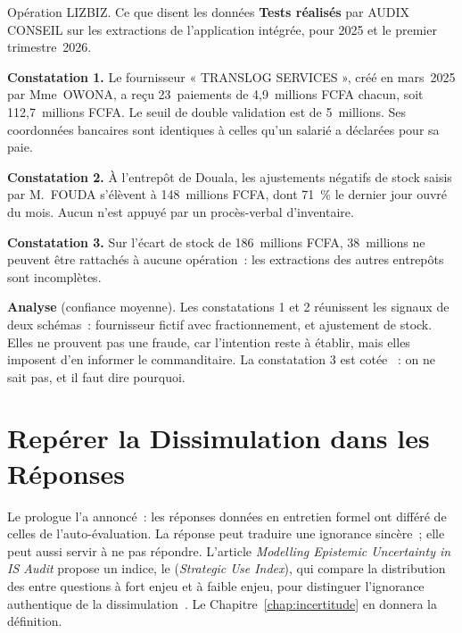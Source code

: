 \begin{boxscenario}{Opération LIZBIZ. Ce que disent les données}
\textbf{Tests réalisés} par AUDIX CONSEIL sur les extractions de l'application
intégrée, pour 2025 et le premier trimestre~2026.

\medskip
\textbf{Constatation 1.} Le fournisseur « TRANSLOG SERVICES », créé en
mars~2025 par Mme~OWONA, a reçu 23~paiements de 4,9~millions FCFA chacun,
soit 112,7~millions FCFA. Le seuil de double validation est de 5~millions.
Ses coordonnées bancaires sont identiques à celles qu'un salarié a déclarées
pour sa paie.

\medskip
\textbf{Constatation 2.} À l'entrepôt de Douala, les ajustements négatifs de
stock saisis par M.~FOUDA s'élèvent à 148~millions FCFA, dont 71~\% le
dernier jour ouvré du mois. Aucun n'est appuyé par un procès-verbal
d'inventaire.

\medskip
\textbf{Constatation 3.} Sur l'écart de stock de 186~millions FCFA, 38~millions
ne peuvent être rattachés à aucune opération~: les extractions des autres
entrepôts sont incomplètes.

\medskip
\textbf{Analyse} (confiance moyenne). Les constatations 1 et 2 réunissent
les signaux de deux schémas~: fournisseur fictif avec fractionnement, et
ajustement de stock. Elles ne prouvent pas une fraude, car l'intention reste
à établir, mais elles imposent d'en informer le commanditaire. La
constatation 3 est cotée \NEK{}~: on ne sait pas, et il faut dire pourquoi.
\end{boxscenario}

\section{Repérer la Dissimulation dans les Réponses}
\label{sec:c04-strategie}

Le prologue l'a annoncé~: les réponses données en entretien formel ont
différé de celles de l'auto-évaluation. La réponse \NEK{} peut traduire une
ignorance sincère~; elle peut aussi servir à ne pas répondre. L'article
\emph{Modelling Epistemic Uncertainty in IS Audit} propose un indice, le
 (\textit{Strategic Use
Index}), qui compare la distribution des \NEK{} entre questions à fort enjeu
et à faible enjeu, pour distinguer l'ignorance authentique de la
dissimulation~\cite{minka2026nek}. Le Chapitre~\ref{chap:incertitude} en
donnera la définition.

